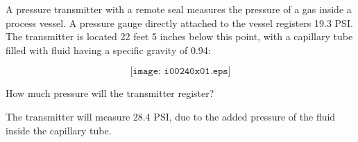 

A pressure transmitter with a remote seal measures the pressure of a gas inside a process vessel.  A pressure gauge directly attached to the vessel registers 19.3 PSI.  The transmitter is located 22 feet 5 inches below this point, with a capillary tube filled with fluid having a specific gravity of 0.94:

$$\texttt{[image: i00240x01.eps]}$$

How much pressure will the transmitter register?







The transmitter will measure 28.4 PSI, due to the added pressure of the fluid inside the capillary tube.










